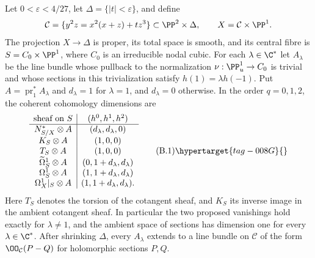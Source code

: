 \begin{proposition}\hypertarget{tag-01BK}{}\label{cdp:st:B1}

\label{wbII:thm:nodal-test}\label{wbII:prop:family-geometry}\label{wbII:prop:nodal-counterexample}
Let $0<\varepsilon<4/27$, let $\Delta=\{|t|<\varepsilon\}$, and define
\[
 \mathcal C=\{y^2z=x^2(x+z)+tz^3\}\subset\PP^2\times\Delta,
 \qquad X=\mathcal C\times\PP^1.
\]
The projection $X\to\Delta$ is proper, its total space is smooth, and its central fibre is $S=C_0\times\PP^1$, where $C_0$ is an irreducible nodal cubic. For each $\lambda\in\C^*$ let $A_\lambda$ be the line bundle whose pullback to the normalization $\nu:\PP^1_u\to C_0$ is trivial and whose sections in this trivialization satisfy $h(1)=\lambda h(-1)$. Put $A=\operatorname{pr}_1^*A_\lambda$ and $d_\lambda=1$ for $\lambda=1$, and $d_\lambda=0$ otherwise. In the order $q=0,1,2$, the coherent cohomology dimensions are
\[
\begin{array}{c|c}
\text{sheaf on }S & (h^0,h^1,h^2)\\\hline
 N^*_{S/X}\otimes A &(d_\lambda,d_\lambda,0)\\
 K_S\otimes A &(1,0,0)\\
 T_S\otimes A &(1,0,0)\\
 \widetilde\Omega^1_S\otimes A &(0,1+d_\lambda,d_\lambda)\\
 \Omega^1_S\otimes A &(1,1+d_\lambda,d_\lambda)\\
 \Omega^1_X|_S\otimes A &(1,1+d_\lambda,d_\lambda).
\end{array}                                                    \tag{B.1}\hypertarget{tag-008G}{}\label{cdp:eq:B.1}
\]
Here $T_S$ denotes the torsion of the cotangent sheaf, and $K_S$ its inverse image in the ambient cotangent sheaf. In particular the two proposed vanishings hold exactly for $\lambda\ne1$, and the ambient space of sections has dimension one for every $\lambda\in\C^*$. After shrinking $\Delta$, every $A_\lambda$ extends to a line bundle on $\mathcal C$ of the form $\OO_{\mathcal C}(P-Q)$ for holomorphic sections $P,Q$.
\end{proposition}

